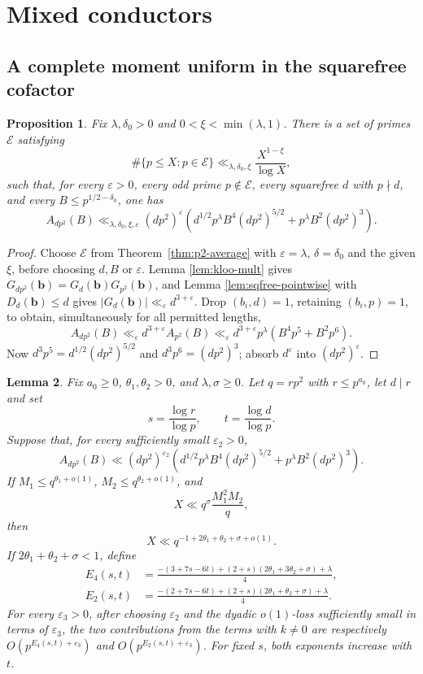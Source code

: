\documentclass[12pt, a4paper]{amsart}
\numberwithin{equation}{section}
\newcommand{\ep}{\varepsilon}
\renewcommand{\le}{\leqslant}
\renewcommand{\ge}{\geqslant}
\theoremstyle{plain}
\newtheorem{lem}{Lemma}[section]
\newtheorem{prop}[lem]{Proposition}
\begin{document}
\section{Mixed conductors}\label{sec:hybrid}

\subsection{A complete moment uniform in the squarefree cofactor}

\begin{prop}\label{prop:hybrid-uniform-exceptional}
Fix $\lambda,\delta_0>0$ and $0<\xi<\min(\lambda,1)$. There is a set of primes $\mathcal E$ satisfying
$$
\#\{p\le X:p\in\mathcal E\}
\ll_{\lambda,\delta_0,\xi}\frac{X^{1-\xi}}{\log X},
$$
such that, for every $\ep>0$, every odd prime $p\notin\mathcal E$, every squarefree $d$ with $p\nmid d$, and every $B\le p^{1/2-\delta_0}$, one has
$$
A_{dp^2}(B)\ll_{\lambda,\delta_0,\xi,\ep}
(dp^2)^\ep\left(d^{1/2}p^\lambda B^4(dp^2)^{5/2}
+p^\lambda B^2(dp^2)^3\right).
$$
\end{prop}

\begin{proof}
Choose $\mathcal E$ from Theorem~\ref{thm:p2-average} with $\ep=\lambda$, $\delta=\delta_0$ and the given $\xi$, before choosing $d,B$ or $\ep$. Lemma \ref{lem:kloo-mult} gives $G_{dp^2}(\mathbf b)=G_d(\mathbf b)G_{p^2}(\mathbf b)$, and Lemma \ref{lem:sqfree-pointwise} with $D_d(\mathbf b)\le d$ gives $|G_d(\mathbf b)|\ll_\ep d^{3+\ep}$. Drop $(b_i,d)=1$, retaining $(b_i,p)=1$, to obtain, simultaneously for all permitted lengths,
$$
A_{dp^2}(B)\ll_\ep d^{3+\ep}A_{p^2}(B)\ll_\ep d^{3+\ep}p^\lambda(B^4p^5+B^2p^6).
$$
Now $d^3p^5=d^{1/2}(dp^2)^{5/2}$ and $d^3p^6=(dp^2)^3$; absorb $d^\ep$ into $(dp^2)^\ep$.
\end{proof}

\begin{lem}\label{lem:hybrid-exponents}
Fix $a_0\ge0$, $\theta_1,\theta_2>0$, and $\lambda,\sigma\ge0$. Let $q=rp^2$ with $r\le p^{a_0}$, let $d\mid r$ and set
$$
s=\frac{\log r}{\log p},\qquad
t=\frac{\log d}{\log p}.
$$
Suppose that, for every sufficiently small $\varepsilon_2>0$,
$$
A_{dp^2}(B)\ll (dp^2)^{\varepsilon_2}
\left(d^{1/2}p^\lambda B^4(dp^2)^{5/2}
+p^\lambda B^2(dp^2)^3\right).
$$
If $M_1\le q^{\theta_1+o(1)}$, $M_2\le q^{\theta_2+o(1)}$, and
$$
X\ll q^\sigma \frac{M_1^2M_2}{q},
$$
then
$$
X\ll q^{-1+2\theta_1+\theta_2+\sigma+o(1)}.
$$
If $2\theta_1+\theta_2+\sigma<1$, define
$$
\begin{aligned}
E_4(s,t)&=
\frac{-(3+7s-6t)
+(2+s)(2\theta_1+3\theta_2+\sigma)+\lambda}{4},\\
E_2(s,t)&=
\frac{-(2+7s-6t)
+(2+s)(2\theta_1+\theta_2+\sigma)+\lambda}{4}.
\end{aligned}
$$
For every $\varepsilon_3>0$, after choosing $\varepsilon_2$ and the dyadic $o(1)$-loss sufficiently small in terms of $\varepsilon_3$, the two contributions from the terms with $k\ne0$ are respectively $O(p^{E_4(s,t)+\varepsilon_3})$ and $O(p^{E_2(s,t)+\varepsilon_3})$. For fixed $s$, both exponents increase with $t$.
\end{lem}
\end{document}
